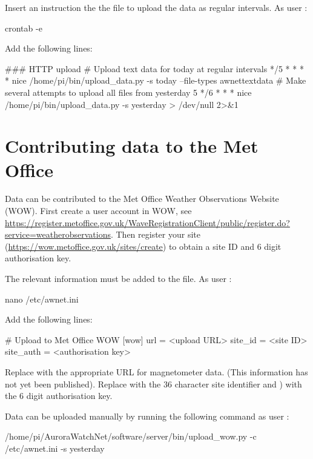 Insert an instruction the the  file to upload the
data as regular intervals. As user \piUser:
\begin{Cmd}
crontab -e
\end{Cmd}
Add the following lines:
\begin{Code}[fontsize=\small]
### HTTP upload
# Upload text data for today at regular intervals
*/5 * * * * nice /home/pi/bin/upload_data.py -s today --file-types awnettextdata
# Make several attempts to upload all files from yesterday
5 */6 * * * nice /home/pi/bin/upload_data.py -s yesterday > /dev/null 2>&1
\end{Code}

\section{Contributing data to the Met Office}

Data can be contributed to the Met Office Weather Observations Website
(WOW). First create a user account in WOW, see
\url{https://register.metoffice.gov.uk/WaveRegistrationClient/public/register.do?service=weatherobservations}. Then
register your site (\url{https://wow.metoffice.gov.uk/sites/create})
to obtain a site ID and 6 digit authorisation key.

The relevant information must be added to the
 file. As user \rootUser:
\begin{Cmd}
nano /etc/awnet.ini 
\end{Cmd}

Add the following lines:
\begin{Code}
# Upload to Met Office WOW
[wow]
url = <upload URL>
site_id = <site ID>
site_auth = <authorisation key>
\end{Code}

Replace  with the appropriate URL for magnetometer
data. (This information has not yet been published). Replace
 with the 36 character site identifier and
) with the 6 digit authorisation key.

Data can be uploaded manually by running the following command as user \piUser:
\begin{Cmd}[fontsize=\relsize{-1.5}]
/home/pi/AuroraWatchNet/software/server/bin/upload_wow.py -c /etc/awnet.ini -s yesterday
\end{Cmd}


